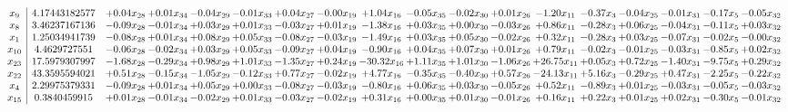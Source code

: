 \documentclass[9pt]{article}
\begin{document}
 \[\begin{array}{c| c c@{\hskip 2pt} c@{\hskip 2pt} c@{\hskip 2pt} c@{\hskip 2pt} c@{\hskip 2pt} c@{\hskip 2pt} c@{\hskip 2pt} c@{\hskip 2pt} c@{\hskip 2pt} c@{\hskip 2pt} c@{\hskip 2pt} c@{\hskip 2pt} c@{\hskip 2pt} c@{\hskip 2pt} c@{\hskip 2pt} c@{\hskip 2pt} }
 x_{9}   &  4.17443182577 & +  0.04 x_{28} & +  0.01 x_{34} & -0.04 x_{29} & -0.01 x_{33} & +  0.04 x_{27} & -0.00 x_{19} & +  1.04 x_{16} & -0.05 x_{35} & -0.02 x_{30} & +  0.01 x_{26} & -1.20 x_{11} & -0.37 x_{3} & -0.04 x_{25} & -0.01 x_{31} & -0.17 x_{5} & -0.05 x_{32}\\
 x_{8}   &  3.46237167136 & -0.09 x_{28} & -0.01 x_{34} & +  0.03 x_{29} & +  0.01 x_{33} & -0.03 x_{27} & +  0.01 x_{19} & -1.38 x_{16} & +  0.03 x_{35} & +  0.00 x_{30} & -0.03 x_{26} & +  0.86 x_{11} & -0.28 x_{3} & +  0.06 x_{25} & -0.04 x_{31} & -0.11 x_{5} & +  0.03 x_{32}\\
 x_{1}   &  1.25034941739 & -0.08 x_{28} & +  0.01 x_{34} & +  0.08 x_{29} & +  0.05 x_{33} & -0.08 x_{27} & -0.03 x_{19} & -1.49 x_{16} & +  0.03 x_{35} & +  0.05 x_{30} & -0.02 x_{26} & +  0.32 x_{11} & -0.28 x_{3} & +  0.03 x_{25} & -0.07 x_{31} & -0.02 x_{5} & -0.00 x_{32}\\
 x_{10}   &  4.4629727551 & -0.06 x_{28} & -0.02 x_{34} & +  0.03 x_{29} & +  0.05 x_{33} & -0.09 x_{27} & +  0.04 x_{19} & -0.90 x_{16} & +  0.04 x_{35} & +  0.07 x_{30} & +  0.01 x_{26} & +  0.79 x_{11} & -0.02 x_{3} & -0.01 x_{25} & -0.03 x_{31} & -0.85 x_{5} & +  0.02 x_{32}\\
 x_{23}   &  17.5979307997 & -1.68 x_{28} & -0.29 x_{34} & +  0.98 x_{29} & +  1.01 x_{33} & -1.35 x_{27} & +  0.24 x_{19} & -30.32 x_{16} & +  1.11 x_{35} & +  1.01 x_{30} & -1.06 x_{26} & + 26.75 x_{11} & +  0.05 x_{3} & +  0.72 x_{25} & -1.40 x_{31} & -9.75 x_{5} & +  0.29 x_{32}\\
 x_{22}   &  43.3595594021 & +  0.51 x_{28} & -0.15 x_{34} & -1.05 x_{29} & -0.12 x_{33} & +  0.77 x_{27} & -0.02 x_{19} & +  4.77 x_{16} & -0.35 x_{35} & -0.40 x_{30} & +  0.57 x_{26} & -24.13 x_{11} & +  5.16 x_{3} & -0.29 x_{25} & +  0.47 x_{31} & -2.25 x_{5} & -0.22 x_{32}\\
 x_{4}   &  2.29975379331 & -0.09 x_{28} & +  0.01 x_{34} & +  0.05 x_{29} & +  0.00 x_{33} & -0.08 x_{27} & -0.03 x_{19} & -0.80 x_{16} & +  0.06 x_{35} & +  0.03 x_{30} & -0.05 x_{26} & +  0.52 x_{11} & -0.89 x_{3} & +  0.01 x_{25} & -0.03 x_{31} & -0.05 x_{5} & -0.03 x_{32}\\
 x_{15}   &  0.3840459915 & +  0.01 x_{28} & -0.01 x_{34} & -0.02 x_{29} & +  0.01 x_{33} & -0.03 x_{27} & -0.02 x_{19} & +  0.31 x_{16} & +  0.00 x_{35} & +  0.01 x_{30} & -0.01 x_{26} & +  0.16 x_{11} & +  0.22 x_{3} & +  0.01 x_{25} & +  0.02 x_{31} & -0.30 x_{5} & -0.01 x_{32}\\

\end{array}\]
\end{document}
